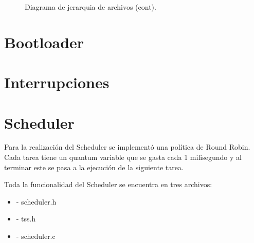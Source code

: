 \documentclass[a4paper,10pt]{article}
\begin{document}
\begin{figure}[H]
\centering
{}
\caption{Diagrama de jerarquia de archivos (cont).}
\end{figure}


\section*{Bootloader}



\section*{Interrupciones}

\section*{Scheduler}

Para la realizaci\'on del Scheduler se implement\'o una pol\'itica de Round Robin. Cada tarea tiene un quantum variable que se gasta cada 1 milisegundo y al terminar este se pasa a la ejecuci\'on de la siguiente tarea.

Toda la funcionalidad del Scheduler se encuentra en tres archivos:
\begin{itemize}
\item	- scheduler.h
\item	- tss.h
\item	- scheduler.c
\end{itemize}
\end{document}
